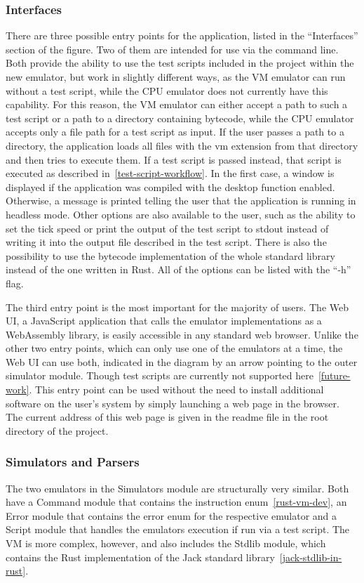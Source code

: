 \subsubsection{Interfaces} \label{interfaces}
There are three possible entry points for the application, listed in the ``Interfaces'' section of the figure.
Two of them are intended for use via the command line.
Both provide the ability to use the test scripts included in the project within the new emulator, but work in slightly different ways, as the VM emulator can run without a test script, while the CPU emulator does not currently have this capability.
For this reason, the VM emulator can either accept a path to such a test script or a path to a directory containing bytecode, while the CPU emulator accepts only a file path for a test script as input.
If the user passes a path to a directory, the application loads all files with the vm extension from that directory and then tries to execute them.
If a test script is passed instead, that script is executed as described in~\cref{test-script-workflow}.
In the first case, a window is displayed if the application was compiled with the desktop function enabled.
Otherwise, a message is printed telling the user that the application is running in headless mode.
Other options are also available to the user, such as the ability to set the tick speed or print the output of the test script to stdout instead of writing it into the output file described in the test script.
There is also the possibility to use the bytecode implementation of the whole standard library instead of the one written in Rust.
All of the options can be listed with the ``-h'' flag.

The third entry point is the most important for the majority of users.
The Web UI, a JavaScript application that calls the emulator implementations as a WebAssembly library, is easily accessible in any standard web browser.
Unlike the other two entry points, which can only use one of the emulators at a time, the Web UI can use both, indicated in the diagram by an arrow pointing to the outer simulator module.
Though test scripts are currently not supported here~\ref{future-work}.
This entry point can be used without the need to install additional software on the user's system by simply launching a web page in the browser.
The current address of this web page is given in the readme file in the root directory of the project.

\subsubsection{Simulators and Parsers}
The two emulators in the Simulators module are structurally very similar. Both have a Command module that contains the instruction enum~\ref{rust-vm-dev}, an Error module that contains the error enum for the respective emulator and a Script module that handles the emulators execution if run via a test script.
The VM is more complex, however, and also includes the Stdlib module, which contains the Rust implementation of the Jack standard library~\ref{jack-stdlib-in-rust}.

